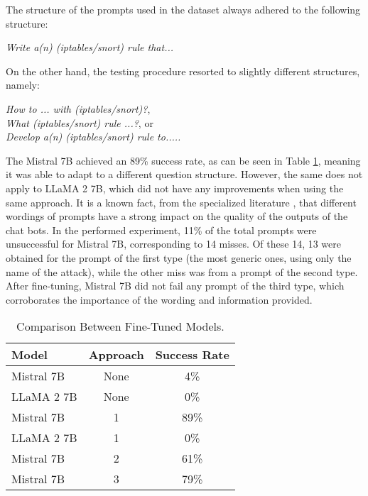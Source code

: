 \documentclass[sigconf]{acmart}
\begin{document}
The structure of the prompts used in the dataset always adhered to the following structure:
\begin{center}
\textit{Write a(n) (iptables/snort) rule that...}
\end{center}
On the other hand, the testing procedure resorted to slightly different structures, namely:
\begin{center}
\textit{How to ... with (iptables/snort)?}, \\
\textit{What (iptables/snort) rule ...?}, or \\
\textit{Develop a(n) (iptables/snort) rule to.....}
\end{center}
The Mistral 7B achieved an 89\% success rate, as can be seen in Table \ref{tab:finetuned-compare}, meaning it was able to adapt to a different question structure. However, the same does not apply to LLaMA 2 7B, which did not have any improvements when using the same approach. It is a known fact, from the specialized literature \cite{Temara23}, that different wordings of prompts have a strong impact on the quality of the outputs of the chat bots. In the performed experiment, 11\% of the total prompts were unsuccessful for Mistral 7B, corresponding to 14 misses. Of these 14, 13 were obtained for the prompt of the first type (the most generic ones, using only the name of the attack), while the other miss was from a prompt of the second type. After fine-tuning, Mistral 7B did not fail any prompt of the third type, which corroborates the importance of the wording and information provided.

\begin{table}[h]
  \caption{Comparison Between Fine-Tuned Models.}
  \label{tab:finetuned-compare}
  \begin{tabular}{@{}lcc@{}}
    \toprule
    \textbf{Model} & \textbf{Approach} & \textbf{Success Rate} \\
    \midrule
    Mistral 7B & None & 4\% \\
    LLaMA 2 7B & None & 0\% \\
    Mistral 7B & 1 & 89\% \\
    LLaMA 2 7B & 1 & 0\% \\
    Mistral 7B & 2 & 61\% \\
    Mistral 7B & 3 & 79\% \\
    \bottomrule
  \end{tabular}
\end{table}
\end{document}
